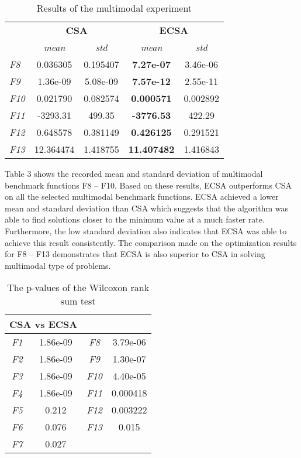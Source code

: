 \documentclass{article}
\begin{document}
\begin{table}[htbp]
    \centering
    \begin{tabular}{lcc|cc}
        \toprule
        & \multicolumn{2}{c}{\textbf{CSA}} & \multicolumn{2}{c}{\textbf{ECSA}} \\ 
        \cmidrule(lr){2-3} \cmidrule(lr){4-5}
        & \textit{mean} & \textit{std} & \textit{mean} & \textit{std} \\ 
        \midrule
        \textit{F8}  & 0.036305  & 0.195407  & \textbf{7.27e-07}  & 3.46e-06  \\ 
        \textit{F9}  & 1.36e-09  & 5.08e-09  & \textbf{7.57e-12}  & 2.55e-11  \\ 
        \textit{F10} & 0.021790  & 0.082574  & \textbf{0.000571}  & 0.002892  \\ 
        \textit{F11} & -3293.31  & 499.35    & \textbf{-3776.53}  & 422.29    \\ 
        \textit{F12} & 0.648578  & 0.381149  & \textbf{0.426125}  & 0.291521  \\ 
        \textit{F13} & 12.364474 & 1.418755  & \textbf{11.407482} & 1.416843  \\ 
        \bottomrule
    \end{tabular}
    \caption{Results of the multimodal experiment}
    \label{tab:multimodal}
\end{table}

Table 3 shows the recorded mean and standard deviation of multimodal benchmark functions F8 – F10. Based on these results, ECSA outperforms CSA on all the selected multimodal benchmark functions. ECSA achieved a lower mean and standard deviation than CSA which suggests that the algorithm was able to find solutions closer to the minimum value at a much faster rate. Furthermore, the low standard deviation also indicates that ECSA was able to achieve this result consistently. The comparison made on the optimization results for F8 – F13 demonstrates that ECSA is also superior to CSA in solving multimodal type of problems.

\begin{table}[htbp]
    \centering
    \begin{tabular}{cc|cc}
        \toprule
        \multicolumn{2}{c|}{\textbf{CSA vs ECSA}} & \multicolumn{2}{c}{\phantom{}} \\ 
        \midrule
        \textit{F1} & 1.86e-09 & \textit{F8} & 3.79e-06 \\
        \textit{F2} & 1.86e-09 & \textit{F9} & 1.30e-07 \\
        \textit{F3} & 1.86e-09 & \textit{F10} & 4.40e-05 \\
        \textit{F4} & 1.86e-09 & \textit{F11} & 0.000418 \\
        \textit{F5} & 0.212 & \textit{F12} & 0.003222 \\
        \textit{F6} & 0.076 & \textit{F13} & 0.015 \\
        \textit{F7} & 0.027 & & \\
        \bottomrule
    \end{tabular}
    \caption{The p-values of the Wilcoxon rank sum test}
    \label{tab:wilcoxon}
\end{table}
\end{document}
